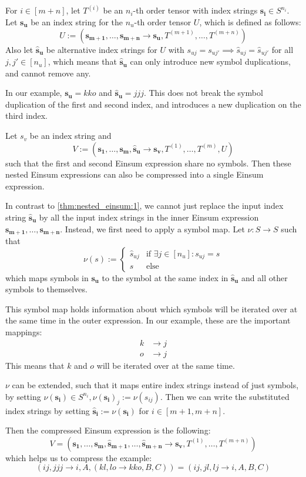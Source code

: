\begin{theorem}
    \label{thm:nested_einsum:2}

    For $i \in [m + n]$, let $T^{(i)}$ be an $n_i$-th order tensor with index strings $\bm{s_i} \in S^{n_i}$.
    Let $\bm{s_u}$ be an index string for the $n_u$-th order tensor $U$, which is defined as follows:
    $$U := (\bm{s_{m + 1}},\dots,\bm{s_{m + n}} \rightarrow \bm{s_u}, T^{(m + 1)},\dots,T^{(m + n)})$$
    Also let $\bm{\hat{s}_u}$ be alternative index strings for $U$ with $s_{uj} = s_{uj'} \implies \hat{s}_{uj} = \hat{s}_{uj'}$ for all $j, j' \in [n_u]$,
    which means that $\bm{\hat{s}_u}$ can only introduce new symbol duplications, and cannot remove any.

    In our example, $\bm{s_u} = kko$ and $\bm{\hat{s}_u} = jjj$.
    This does not break the symbol duplication of the first and second index,
    and introduces a new duplication on the third index.

    Let $s_v$ be an index string and
    $$V := (\bm{s_1},\dots,\bm{s_m}, \bm{\hat{s}_u} \rightarrow \bm{s_v}, T^{(1)},\dots,T^{(m)}, U)$$
    such that the first and second Einsum expression share no symbols.
    Then these nested Einsum expressions can also be compressed into a single Einsum expression.

    In contrast to \autoref{thm:nested_einsum:1}, we cannot just replace the input index string $\bm{\hat{s}_u}$ by all the input index strings in the inner Einsum expression $\bm{s_{m + 1}},\dots,\bm{s_{m + n}}$.
    Instead, we first need to apply a symbol map.
    Let $\nu: S \rightarrow S$ such that
    $$\nu(s) := \begin{cases}
            \hat{s}_{uj} & \text{if }\exists j \in [n_u]: s_{uj} = s \\
            s            & \text{else}
        \end{cases}$$
    which maps symbols in $\bm{s_u}$ to the symbol at the same index in $\bm{\hat{s}_u}$ and all other symbols to themselves.

    This symbol map holds information about which symbols will be iterated over at the same time in the outer expression.
    In our example, these are the important mappings:
    \begin{align*}
        k & \rightarrow j \\
        o & \rightarrow j
    \end{align*}
    This means that $k$ and $o$ will be iterated over at the same time.

    $\nu$ can be extended, such that it maps entire index strings instead of just symbols, by setting $\nu(\bm{s_i}) \in S^{n_i}, \nu(\bm{s_i})_j := \nu(s_{ij})$.
    Then we can write the substituted index strings by setting $\bm{\hat{s}_i} := \nu(\bm{s_i})$ for $i \in [m + 1, m + n]$.

    Then the compressed Einsum expression is the following:
    $$V = (\bm{s_1},\dots,\bm{s_m}, \bm{\hat{s}_{m + 1}}, \dots, \bm{\hat{s}_{m + n}} \rightarrow \bm{s_v}, T^{(1)},\dots,T^{(m + n)})$$
    which helps us to compress the example:
    $$(ij, jjj \rightarrow i, A, (kl, lo \rightarrow kko, B, C)) = (ij, jl, lj \rightarrow i, A, B, C)$$
\end{theorem}

